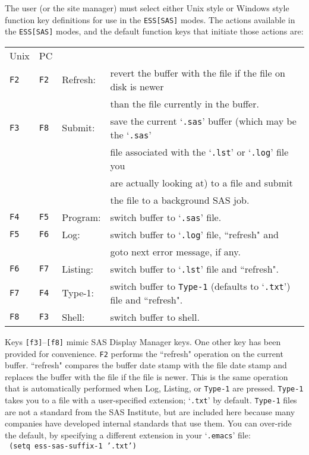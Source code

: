 \documentclass{article}
\newcommand{\stexttt}[1]{{\small\texttt{#1}}}
\newcommand{\elcode}[1]{\\{\stexttt{\hspace*{2em} #1}}\\}
\newcommand{\file}[1]{`\stexttt{#1}'}
\begin{document}
The user (or the site manager) must select either Unix style or
Windows style function key definitions for use in the
\stexttt{ESS[SAS]} modes.  The actions available in the
\stexttt{ESS[SAS]} modes, and the default function keys that initiate
those actions are:\\
\begin{tabular}{llll}
Unix& PC&\\
\stexttt{F2} &\stexttt{F2}& Refresh:&revert the buffer with the file if the file on disk is newer\\
\stexttt{}   &\stexttt{}  &         &       than the file currently in the buffer.\\
\stexttt{F3} &\stexttt{F8}& Submit: &save   the current \file{.sas} buffer (which may be the \file{.sas}\\
\stexttt{}   &\stexttt{}  &         &       file associated with the \file{.lst} or \file{.log} file you\\
\stexttt{}   &\stexttt{}  &         &       are actually looking at) to a file and submit\\
\stexttt{}   &\stexttt{}  &         &       the file to a background SAS job.\\
\stexttt{F4} &\stexttt{F5}& Program:&switch buffer to \file{.sas} file.\\
\stexttt{F5} &\stexttt{F6}& Log:    &switch buffer to \file{.log} file, ``refresh" and \\
\stexttt{}   &\stexttt{}  &         &        goto next error message, if any.\\
\stexttt{F6} &\stexttt{F7}& Listing:&switch buffer to \file{.lst} file and ``refresh".\\
\stexttt{F7} &\stexttt{F4}& Type-1: &switch buffer to \stexttt{Type-1} (defaults to \file{.txt}) file and ``refresh".\\
\stexttt{F8} &\stexttt{F3}& Shell:  &switch buffer to shell.\\
\end{tabular}


Keys \stexttt{[f3]}--\stexttt{[f8]} mimic SAS Display Manager keys.
One other key has been provided for convenience.  \stexttt{F2}
performs the ``refresh" operation on the current buffer.  ``refresh"
compares the buffer date stamp with the file date stamp and replaces
the buffer with the file if the file is newer.  This is the same
operation that is automatically performed when Log, Listing, or
\stexttt{Type-1} are pressed.  \stexttt{Type-1} takes you to a file
with a user-specified extension; \file{.txt} by default.
\stexttt{Type-1} files are not a standard from the SAS Institute, but
are included here because many companies have developed internal
standards that use them.  You can over-ride the default, by specifying
a different extension in your \file{.emacs} file:
\elcode{(setq ess-sas-suffix-1 '.txt')}
\end{document}
